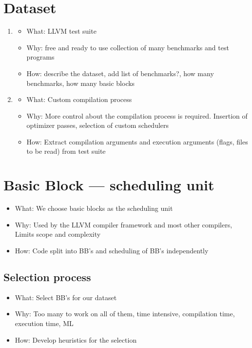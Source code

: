 \section{Dataset}
\label{sec:approach:dataset}
\begin{enumerate}
    \item 
    \begin{itemize}
        \item What: LLVM test suite
        \item Why: free and ready to use collection of many benchmarks and test programs
        \item How: describe the dataset, add list of benchmarks?, how many benchmarks, how many basic blocks
    \end{itemize}
    \item
    \begin{itemize}
        \item What: Custom compilation process
        \item Why: More control about the compilation process is required. Insertion of optimizer passes, selection of custom schedulers
        \item How: Extract compilation arguments and execution arguments (flags, files to be read) from test suite
    \end{itemize}
\end{enumerate}
    
\section{Basic Block --- scheduling unit}
\label{sec:approach:basicblock}
\begin{itemize}
    \item What: We choose basic blocks as the scheduling unit
    \item Why: Used by the LLVM compiler framework and most other compilers, Limits scope and complexity
    \item How: Code split into BB's and scheduling of BB's independently
\end{itemize}

\subsection{Selection process}
\begin{itemize}
    \item What: Select BB's for our dataset
    \item Why: Too many to work on all of them, time intensive, compilation time, execution time, ML
    \item How: Develop heuristics for the selection
\end{itemize}
